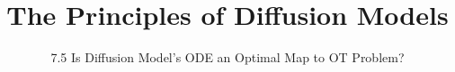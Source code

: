 ﻿%

\graphicspath{{../images/}}
\title{The Principles of Diffusion Models}
\subtitle{7.5 Is Diffusion Model's ODE an Optimal Map to OT Problem?}


\begin{frame}
    \titlepage
\end{frame}



